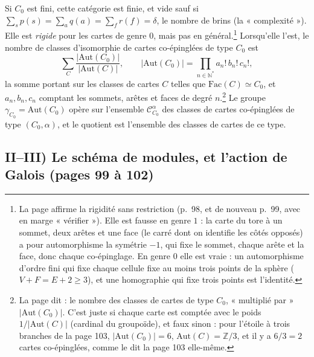 \documentclass[11pt,a4paper]{article}
\begin{document}
Si $C_{0}$ est fini, cette catégorie est finie, et vide sauf si $\sum_{s} p(s) =
\sum_{a} q(a) = \sum_{f} r(f) = \delta$, le nombre de brins (la
« complexité »). Elle est \emph{rigide} pour les cartes de genre $0$, mais pas
en général.\footnote{La page affirme la rigidité sans restriction (p.~98, et de
nouveau p.~99, avec en marge « vérifier »). Elle est fausse en genre $1$ : la
carte du tore à un sommet, deux arêtes et une face (le carré dont on identifie
les côtés opposés) a pour automorphisme la symétrie $-1$, qui fixe le sommet,
chaque arête et la face, donc chaque co-épinglage. En genre $0$ elle est vraie :
un automorphisme d'ordre fini qui fixe chaque cellule fixe au moins trois
points de la sphère ($V + F = E + 2 \geqslant 3$), et une homographie qui fixe trois
points est l'identité.} Lorsqu'elle l'est, le nombre de classes d'isomorphie
de cartes co-épinglées de type $C_{0}$ est
\[
\sum_{C} \frac{|\mathrm{Aut}(C_{0})|}{|\mathrm{Aut}(C)|}, \qquad
|\mathrm{Aut}(C_{0})| = \prod_{n \in \mathbb{N}^{*}} a_{n}!\, b_{n}!\, c_{n}!,
\]
la somme portant sur les classes de cartes $C$ telles que $\mathrm{Fac}(C)
\simeq C_{0}$, et $a_{n}, b_{n}, c_{n}$ comptant les sommets, arêtes et faces de
degré $n$.\footnote{La page dit : le nombre des classes de cartes de type
$C_{0}$, « multiplié par » $|\mathrm{Aut}(C_{0})|$. C'est juste si chaque carte
est comptée avec le poids $1/|\mathrm{Aut}(C)|$ (cardinal du groupoïde), et
faux sinon : pour l'étoile à trois branches de la page 103, $|\mathrm{Aut}(C_{0})|
= 6$, $\mathrm{Aut}(C) = \mathbb{Z}/3$, et il y a $6/3 = 2$ cartes co-épinglées,
comme le dit la page 103 elle-même.} Le groupe $\gamma_{C_{0}} =
\mathrm{Aut}(C_{0})$ opère sur l'ensemble $\mathcal{C}^{\alpha}_{C_{0}}$ des
classes de cartes co-épinglées de type $(C_{0}, \alpha)$, et le quotient est
l'ensemble des classes de cartes de ce type.

\subsection*{II--III) Le schéma de modules, et l'action de Galois (pages 99 à 102)}
\end{document}
